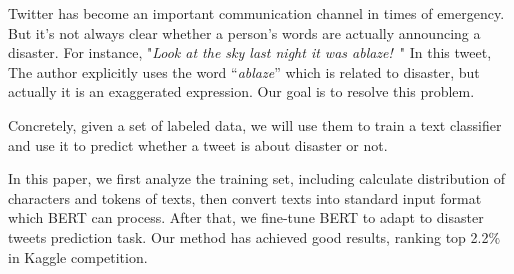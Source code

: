 \documentclass{amsart}
\begin{document}





Twitter has become an important communication channel in times of emergency. But it’s not always clear whether a person’s words are actually announcing a disaster. For instance, "\emph{Look at the sky last night it was ablaze!}\ " In this tweet, The author explicitly uses the word “\emph{ablaze}” which is related to disaster, but actually it is an exaggerated expression. Our goal is to resolve this problem. 

Concretely, given a set of labeled data, we will use them to train a text classifier and use it to predict whether a tweet is about disaster or not. 

In this paper, we first analyze the training set, including calculate distribution of characters and tokens of texts, then convert texts into standard input format which BERT can process. After that, we fine-tune BERT to adapt to disaster tweets prediction task. Our method has achieved good results, ranking top 2.2$\%$ in Kaggle competition.


\end{document}
